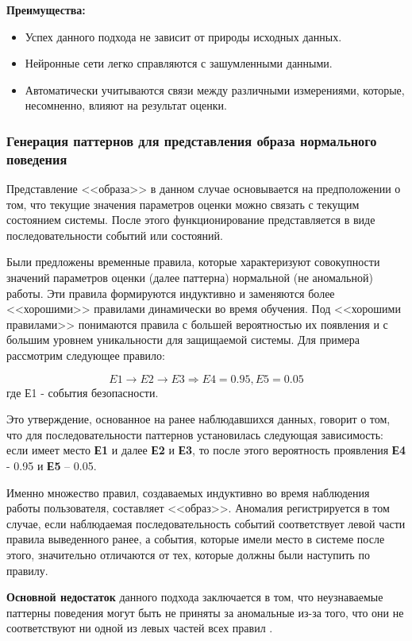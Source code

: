 \textbf{Преимущества:}
\begin{itemize}
    \item Успех данного подхода не зависит от природы исходных данных.
    \item Нейронные сети легко справляются с зашумленными данными.
    \item Автоматически учитываются связи между различными измерениями, которые,
    несомненно, влияют на результат оценки.
\end{itemize}


\subsubsection{Генерация паттернов для представления образа нормального поведения}
Представление <<образа>> в данном случае основывается на предположении о том, что текущие значения
параметров оценки можно связать с текущим состоянием системы. После этого функционирование
представляется в виде последовательности событий или состояний.

Были предложены временные правила, которые характеризуют совокупности значений параметров оценки
(далее паттерна) нормальной (не аномальной) работы. Эти правила формируются индуктивно и заменяются
более <<хорошими>> правилами динамически во время обучения. Под <<хорошими правилами>> понимаются правила
с большей вероятностью их появления и с большим уровнем уникальности для защищаемой системы.
Для примера рассмотрим следующее правило:

\begin{equation}
	E1 \rightarrow E2\rightarrow E3 \Rightarrow E4 = 0.95, E5 = 0.05
\end{equation}
где Е1 - события безопасности.

Это утверждение, основанное на ранее наблюдавшихся данных, говорит о том, что для последовательности
паттернов установилась следующая зависимость: если имеет место \textbf{Е1} и далее \textbf{Е2} и \textbf{Е3},
то после этого вероятность проявления \textbf{Е4} - 0.95 и \textbf{Е5} – 0.05.

Именно множество правил, создаваемых индуктивно во время наблюдения работы пользователя, составляет <<образ>>.
Аномалия регистрируется в том случае, если наблюдаемая последовательность событий соответствует левой
части правила выведенного ранее, а события, которые имели место в системе после этого,
значительно отличаются от тех, которые должны были наступить по правилу.

\textbf{Основной недостаток} данного подхода заключается в том, что неузнаваемые паттерны поведения могут
быть не приняты за аномальные из-за того, что они не соответствуют ни одной из левых частей
всех правил \autocite{IDSystem}.

